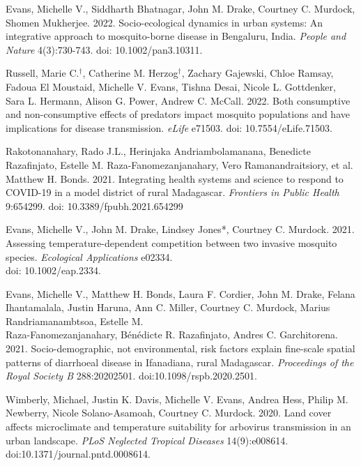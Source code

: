 \begin{etaremune}
\item \textcolor{awesome}{Evans, Michelle V.}, Siddharth Bhatnagar, John M. Drake, Courtney C. Murdock, Shomen Mukherjee. 2022. Socio-ecological dynamics in urban systems: An integrative approach to mosquito-borne disease in Bengaluru, India. \textit{People and Nature} 4(3):730-743. doi: 10.1002/pan3.10311. \smallskip

\item Russell, Marie C.$^\dagger$, Catherine M. Herzog$^\dagger$, Zachary Gajewski, Chloe Ramsay, Fadoua El Moustaid, \textcolor{awesome}{Michelle V. Evans}, Tishna Desai, Nicole L. Gottdenker, Sara L. Hermann, Alison G. Power, Andrew C. McCall. 2022. Both consumptive and non-consumptive effects of predators impact mosquito populations and have implications for disease transmission. \textit{eLife} e71503. doi: 10.7554/eLife.71503. \smallskip

\item Rakotonanahary, Rado J.L., Herinjaka Andriambolamanana, Benedicte Razafinjato, Estelle M. Raza-Fanomezanjanahary, Vero Ramanandraitsiory, et al. Matthew H. Bonds. 2021. Integrating health systems and science to respond to COVID-19 in a model district of rural Madagascar. \textit{Frontiers in Public Health} 9:654299. doi: 10.3389/fpubh.2021.654299 \smallskip

\item \textcolor{awesome}{Evans, Michelle V.}, John M. Drake, Lindsey Jones*, Courtney C. Murdock. 2021. Assessing temperature-dependent competition between two invasive mosquito species. \textit{Ecological Applications} e02334. \\ doi: 10.1002/eap.2334. \smallskip

\item \textcolor{awesome}{Evans, Michelle V.}, Matthew H. Bonds, Laura F. Cordier, John M. Drake, Felana Ihantamalala, Justin Haruna, Ann C. Miller, Courtney C. Murdock, Marius Randriamanambtsoa, Estelle M. \\ Raza-Fanomezanjanahary, Bénédicte R. Razafinjato, Andres C. Garchitorena. 2021. Socio-demographic, not environmental, risk factors explain fine-scale spatial patterns of diarrhoeal disease in Ifanadiana, rural Madagascar. \textit{Proceedings of the Royal Society B} 288:20202501. doi:10.1098/rspb.2020.2501. \smallskip

\item Wimberly, Michael, Justin K. Davis, \textcolor{awesome}{Michelle V. Evans}, Andrea Hess, Philip M. Newberry, Nicole Solano-Asamoah, Courtney C. Murdock. 2020. Land cover affects microclimate and temperature suitability for arbovirus transmission in an urban landscape. \textit{PLoS Neglected Tropical Diseases} 14(9):e008614. doi:10.1371/journal.pntd.0008614. \smallskip


\end{etaremune}

